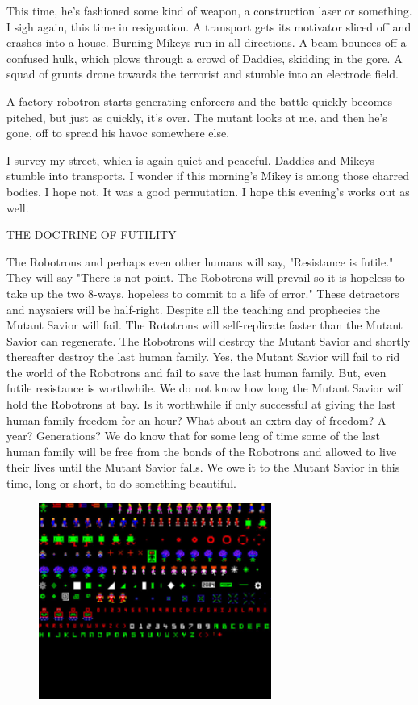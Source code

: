\documentclass{amsbook}
\begin{document}
This time, he's fashioned some kind of weapon, a construction laser or something.  I sigh again, this time in resignation.  A transport gets its motivator sliced off and crashes into a house.  Burning Mikeys run in all directions.  A beam bounces off a confused hulk, which plows through a crowd of Daddies, skidding in the gore.  A squad of grunts drone towards the terrorist and stumble into an electrode field.

A factory robotron starts generating enforcers and the battle quickly becomes pitched, but just as quickly, it's over.  The mutant looks at me, and then he's gone, off to spread his havoc somewhere else.

I survey my street, which is again quiet and peaceful.  Daddies and Mikeys stumble into transports.  I wonder if this morning's Mikey is among those charred bodies.  I hope not.  It was a good permutation.  I hope this evening's works out as well.

\clearpage
    {\ROBOFONTx THE DOCTRINE OF FUTILITY}

The Robotrons and perhaps even other humans will say, "Resistance is
futile." They will say "There is not point. The Robotrons will prevail
so it is hopeless to take up the two 8-ways, hopeless to commit to a
life of error." These detractors and naysaiers will be half-right.
Despite all the teaching and prophecies the Mutant Savior will fail.
The Rototrons will self-replicate faster than the Mutant Savior can
regenerate. The Robotrons will destroy the Mutant Savior and shortly
thereafter destroy the last human family. Yes, the Mutant Savior will
fail to rid the world of the Robotrons and fail to  save the last
human family. But, even futile resistance is worthwhile. We do not
know how long the Mutant Savior will hold the Robotrons at bay. Is it
worthwhile if only successful at giving the last human family freedom
for an hour? What about an extra day of freedom? A year? Generations?
We do know that for some leng of time some of the last human family
will be free from the bonds of the Robotrons and allowed to live their
lives until the Mutant Savior falls. We owe it to the Mutant Savior in
this time, long or short, to do something beautiful.

\begin{figure}[h]
  \includegraphics[width=3in]{robotronsprites.jpg}
\end{figure}
\end{document}
